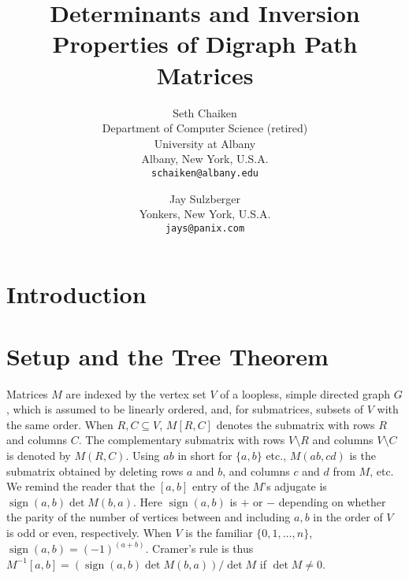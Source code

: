\documentclass[12pt]{article}
\title{Determinants and Inversion Properties of Digraph Path Matrices}
\author{Seth Chaiken\\
\small Department of Computer Science (retired)\\[-0.8ex]
\small University at Albany\\[-0.8ex] 
\small Albany, New York, U.S.A.\\
\small\tt schaiken@albany.edu\\
\and
Jay Sulzberger\\
\small Yonkers, New York, U.S.A.\\
\small\tt jays@panix.com}
\DeclareMathOperator{\sign}{sign}
\begin{document}
\maketitle


\begin{abstract}
\end{abstract}

\section{Introduction}


\section{Setup and the Tree Theorem}

Matrices $M$ are indexed by the vertex set $V$ of a loopless, simple
directed graph $G$,
which is assumed to be linearly ordered, and, for submatrices,
subsets of $V$ with the same order.
When $R,C\subseteq V$, $M[R,C]$ denotes the submatrix with rows $R$ and columns $C$. The
complementary submatrix with rows $V\setminus R$ and columns $V\setminus C$ is denoted by
$M(R,C)$.  Using $ab$  in short for $\{a,b\}$ etc., $M(ab,cd)$ is the submatrix obtained by deleting
rows $a$ and $b$, and columns $c$ and $d$ from $M$, etc.  We remind the reader that the $[a,b]$ entry
of the $M$'s adjugate is $\sign(a,b)\det M(b,a)$.   Here $\sign(a,b)$ is $+$ or $-$ depending on
whether the parity of the number of vertices between and including $a,b$ in the order of $V$
is odd or even,
respectively.  When $V$ is the familiar $\{0, 1, \ldots, n\}$, $\sign(a,b)=(-1)^{(a+b)}$.
Cramer's rule is thus $M^{-1}[a,b]=(\sign(a,b)\det M(b,a))/\det M$ if $\det M \neq 0$.
\end{document}
